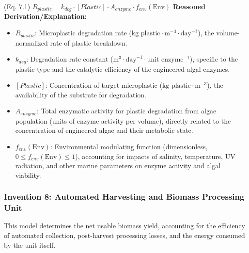 \documentclass{article}
\newenvironment{reasonedderivation}{
    \textbf{Reasoned Derivation/Explanation:}
    \begin{itemize}
}{
    \end{itemize}
}
\begin{document}
(Eq. 7.1) $R_{plastic} = k_{deg} \cdot [Plastic] \cdot A_{enzyme} \cdot f_{env}(\text{Env})$
\begin{reasonedderivation}
    \item $R_{plastic}$: Microplastic degradation rate ($\text{kg plastic} \cdot \text{m}^{-3} \cdot \text{day}^{-1}$), the volume-normalized rate of plastic breakdown.
    \item $k_{deg}$: Degradation rate constant ($\text{m}^3 \cdot \text{day}^{-1} \cdot \text{unit enzyme}^{-1}$), specific to the plastic type and the catalytic efficiency of the engineered algal enzymes.
    \item $[Plastic]$: Concentration of target microplastic ($\text{kg plastic} \cdot \text{m}^{-3}$), the availability of the substrate for degradation.
    \item $A_{enzyme}$: Total enzymatic activity for plastic degradation from algae population (units of enzyme activity per volume), directly related to the concentration of engineered algae and their metabolic state.
    \item $f_{env}(\text{Env})$: Environmental modulating function (dimensionless, $0 \le f_{env}(\text{Env}) \le 1$), accounting for impacts of salinity, temperature, UV radiation, and other marine parameters on enzyme activity and algal viability.
\end{reasonedderivation}

\subsubsection*{Invention 8: Automated Harvesting and Biomass Processing Unit}
This model determines the net usable biomass yield, accounting for the efficiency of automated collection, post-harvest processing losses, and the energy consumed by the unit itself.
\end{document}
